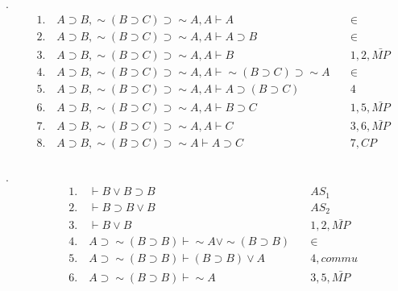 \documentclass[a4paper]{ctexart}
\begin{document}
.
\begin{align*}
  &1. \quad A\supset B,\sim(B\supset C)\supset \sim A,A \vdash A \quad &\in\\
  &2. \quad A\supset B,\sim(B\supset C)\supset \sim A,A \vdash A\supset B\quad &\in\\
  &3. \quad A\supset B,\sim(B\supset C)\supset \sim A,A \vdash B \quad &1,2,\bar{MP}\\
  &4. \quad A\supset B,\sim(B\supset C)\supset \sim A,A \vdash \sim(B\supset C)\supset \sim A \quad &\in\\
  &5. \quad A\supset B,\sim(B\supset C)\supset \sim A,A \vdash A\supset(B\supset C)\quad &4 \\
  &6. \quad A\supset B,\sim(B\supset C)\supset \sim A,A \vdash B\supset C\quad &1,5,\bar{MP} \\
  &7. \quad A\supset B,\sim(B\supset C)\supset \sim A,A \vdash C\quad &3,6,\bar{MP} \\
  &8. \quad A\supset B,\sim(B\supset C)\supset \sim A \vdash A\supset C\quad &7,CP \\
\end{align*}

.
\begin{align*}
  &1. \quad  \vdash B\vee B\supset B \quad &AS_1 \\
  &2. \quad  \vdash B\supset B\vee B \quad &AS_2 \\
  &3. \quad  \vdash B\vee B \quad &1,2,\bar{MP} \\
  &4. \quad  A\supset\sim(B\supset B)\vdash \sim A \vee \sim(B\supset B)\quad &\in \\
  &5. \quad  A\supset\sim(B\supset B)\vdash (B\supset B)\vee A \quad &4, commu \\
  &6. \quad  A\supset\sim(B\supset B)\vdash \sim A \quad &3,5,\bar{MP} \\
\end{align*}
\end{document}
